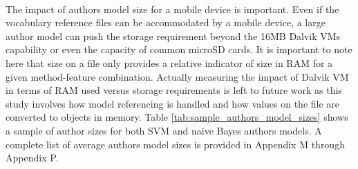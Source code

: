 	\paragraph*{} The impact of authors model size for a mobile device is important. Even if the vocabulary reference files can be accommodated by a mobile device, a large author model can push the storage requirement beyond the 16MB Dalvik VMs capability or even the capacity of common microSD cards.  It is important to note here that size on a file only provides a relative indicator of size in RAM for a given method-feature combination.  Actually measuring the impact of Dalvik VM in terms of RAM used versus storage requirements is left to future work as this study involves how model referencing is handled and how values on the file are converted to objects in memory. Table \ref{tab:sample_authors_model_sizes} shows a sample of author sizes for both SVM and naive Bayes authors models.  A complete list of average authors model sizes is provided in Appendix M through Appendix P.
	
